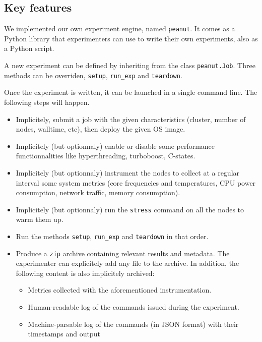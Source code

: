         \subsection{Key features}%
        \label{sub:key_features}
            We implemented our own experiment engine, named \texttt{peanut}. It comes as a Python library that
            experimenters can use to write their own experiments, also as a Python script.

            A new experiment can be defined by inheriting from the class \texttt{peanut.Job}. Three methods can be
            overriden, \texttt{setup}, \texttt{run\_exp} and \texttt{teardown}.

            Once the experiment is written, it can be launched in a single command line. The following steps will
            happen.
            \begin{itemize}
                \item Implicitely, submit a job with the given characteristics (\eg cluster, number of nodes, walltime,
                    etc), then deploy the given OS image.
                \item Implicitely (but optionnaly) enable or disable some performance functionnalities like
                    hyperthreading, turboboost, C-states.
                \item Implicitely (but optionnaly) instrument the nodes to collect at a regular interval some system
                    metrics (\eg core frequencies and temperatures, CPU power consumption, network traffic, memory
                    consumption).
                \item Implicitely (but optionnaly) run the \texttt{stress} command on all the nodes to warm them up.
                \item Run the methods \texttt{setup}, \texttt{run\_exp} and \texttt{teardown} in that order.
                \item Produce a \texttt{zip} archive containing relevant results and metadata. The experimenter can
                    explicitely add any file to the archive. In addition, the following content is also implicitely
                    archived:
                    \begin{itemize}
                        \item Metrics collected with the aforementioned instrumentation.
                        \item Human-readable log of the commands issued during the experiment.
                        \item Machine-parsable log of the commands (in JSON format) with their timestamps and output

\end{itemize}
\end{itemize}
